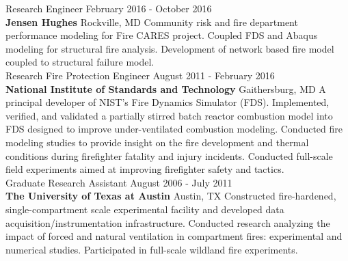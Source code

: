 \documentclass[10pt,letterpaper]{article}
\begin{document}
Research Engineer \hfill February 2016 - October 2016 \\
{\bf Jensen Hughes} \hfill Rockville, MD \vskip3pt
Community risk and fire department performance modeling for Fire CARES project. Coupled FDS and Abaqus modeling for structural fire analysis. Development of network based fire model coupled to structural failure model.\\

Research Fire Protection Engineer \hfill August 2011 - February 2016 \\
{\bf National Institute of Standards and Technology} \hfill Gaithersburg, MD \vskip3pt
A principal developer of NIST's Fire Dynamics Simulator (FDS). Implemented, verified, and validated a partially stirred batch reactor combustion model into FDS designed to improve under-ventilated combustion modeling. Conducted fire modeling studies to provide insight on the fire development and thermal conditions during firefighter fatality and injury incidents. Conducted full-scale field experiments aimed at improving firefighter safety and tactics. \\

Graduate Research Assistant \hfill August 2006 - July 2011 \\
{\bf The University of Texas at Austin} \hfill Austin, TX \vskip3pt
Constructed fire-hardened, single-compartment scale experimental facility and developed data acquisition/instrumentation infrastructure. Conducted research analyzing the impact of forced and natural ventilation in compartment fires: experimental and numerical studies. Participated in full-scale wildland fire experiments. \\


\end{document}
